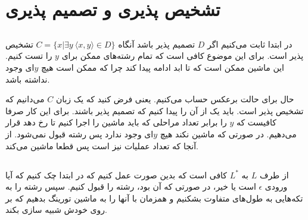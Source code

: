 \section{تشخيص پذيری و تصميم پذيری}
\subsection{}
در ابتدا ثابت می‌کنیم اگر
$D$
تصمیم پذیر باشد آنگاه
$C = \{x | \exists y ~ \langle x, y \rangle \in D\}$
تشخیص پذیر است. برای این موضوع کافی است که تمام رشته‌های ممکن برای
$y$
را تست کنیم. این ماشین ممکن است که تا ابد ادامه پیدا کند چرا که ممکن است هیچ
$y$ای وجود نداشته باشد.

حال برای حالت برعکس حساب می‌کنیم. یعنی فرض کنید که یک زبان
$C$
می‌دانیم که تشخیص پذیر است. باید یک
از آن را پیدا کنیم که تصمیم پذیر باشند. برای این کار صرفا کافیست که
$y$
را برابر تعداد مراحلی که باید ماشین را اجرا کنیم تا
رخ دهد قرار می‌دهیم. در صورتی که ماشین
نکند هیچ
$y$ای
وجود ندارد پس رشته قبول نمی‌شود. از آنجا که تعداد عملیات نیز
است پس قطعا ماشین
می‌کند.

\subsection{}
از طرف
$L$
به
$L^*$
کافی است که بدین صورت عمل کنیم که در ابتدا چک کنیم که آیا ورودی
$\epsilon$
است یا خیر، در صورتی که آن بود، رشته را قبول کنیم. سپس رشته را به تکه‌هایی به طول‌‌های متفاوت بشکنیم
و همزمان با
آنها را به ماشین تورینگ بدهیم که بر روی خودش شبیه سازی بکند.